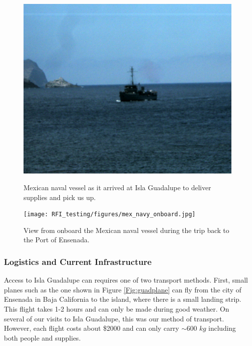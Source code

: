 \begin{figure}[htb]
\centering
\begin{minipage}[b]{0.43\textwidth}
\centering
\includegraphics[width=0.95\linewidth]{RFI_testing/figures/mex_navy_arrival.jpg}
\caption{Mexican naval vessel as it arrived at Isla Guadalupe to deliver supplies and pick us up.}
\label{Fig:guadboat}
\end{minipage}%
\begin{minipage}[b]{0.02\textwidth}
\hspace{1cm}
\end{minipage}%
\begin{minipage}[b]{0.51\textwidth}
\centering
\texttt{[image: RFI\_testing/figures/mex\_navy\_onboard.jpg]}
\caption{View from onboard the Mexican naval vessel during the trip back to the Port of Ensenada.}
\label{Fig:guadonboard}
\end{minipage}
\end{figure}

\subsubsection{Logistics and Current Infrastructure}

Access to Isla Guadalupe can requires one of two transport methods. First, small planes such as the one shown in Figure \ref{Fig:guadplane} can fly from the city of Ensenada in Baja California to the island, where there is a small landing strip. This flight takes 1-2 hours and can only be made during good weather. On several of our visits to Isla Guadalupe, this was our method of transport. However, each flight costs about \$2000 and can only carry $\sim$600 $kg$ including both people and supplies. 

